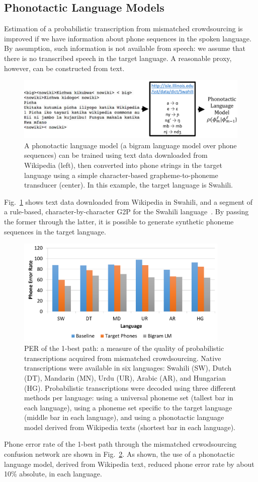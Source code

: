 \subsection{Phonotactic Language Models}
\label{sec:phonotactic}

Estimation of a probabilistic transcription from mismatched
crowdsourcing is improved if we have information about phone sequences
in the spoken language. By assumption, such information is not
available from speech: we assume that there is no transcribed speech
in the target language.  A reasonable proxy, however, can be
constructed from text.

\begin{figure}
  \centerline{\includegraphics[width=5in]{../figs/fig_sloan.png}}
  \caption{A phonotactic language model (a bigram language model over
    phone sequences) can be trained using text data downloaded from
    Wikipedia (left), then converted into phone strings in the target
    language using a simple character-based grapheme-to-phoneme
    transducer (center).  In this example, the target language is
    Swahili.}
  \label{fig:wikitext}
\end{figure}

Fig.~\ref{fig:wikitext} shows text data downloaded from Wikipedia in
Swahili, and a segment of a rule-based, character-by-character G2P for
the Swahili language~\cite{Hasegawajohnson15}.  By passing the former
through the latter, it is possible to generate synthetic phoneme
sequences in the target language.

\begin{figure}
  \centerline{\includegraphics[width=4in]{../figs/sloan2.png}}
  \caption{PER of the 1-best path: a measure of the quality of
    probabilistic transcriptions acquired from mismatched
    crowdsourcing.  Native transcriptions were available in six
    languages: Swahili (SW), Dutch (DT), Mandarin (MN), Urdu (UR),
    Arabic (AR), and Hungarian (HG).  Probabilistic transcriptions
    were decoded using three different methods per language: using a
    universal phoneme set (tallest bar in each language), using a
    phoneme set specific to the target language (middle bar in each
    language), and using a phonotactic language model derived from
    Wikipedia texts (shortest bar in each language).}
  \label{fig:pt_decode_per}
\end{figure}

Phone error rate of the 1-best path through the mismatched
crwodsourcing confusion network are shown in
Fig.~\ref{fig:pt_decode_per}.  As shown, the use of a phonotactic
language model, derived from Wikipedia text, reduced phone error rate
by about 10\% absolute, in each language.

